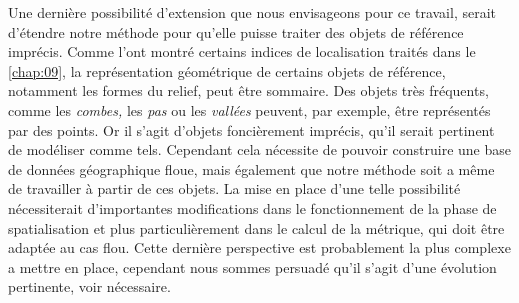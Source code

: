 Une dernière possibilité d'extension que nous envisageons pour ce
travail, serait d'étendre notre méthode pour qu'elle puisse traiter
des objets de référence imprécis. Comme l'ont montré certains indices
de localisation traités dans le \autoref{chap:09}, la représentation
géométrique de certains objets de référence, notamment les formes du
relief, peut être sommaire. Des objets très fréquents, comme les
\emph{combes,} les \emph{pas} ou les \emph{vallées} peuvent, par
exemple, être représentés par des points. Or il s'agit d'objets
foncièrement imprécis, qu'il serait pertinent de modéliser comme
tels. Cependant cela nécessite de pouvoir construire une base de
données géographique floue, mais également que notre méthode soit a
même de travailler à partir de ces objets. La mise en place d'une
telle possibilité nécessiterait d'importantes modifications dans le
fonctionnement de la phase de spatialisation et plus particulièrement
dans le calcul de la métrique, qui doit être adaptée au cas
flou. Cette dernière perspective est probablement la plus complexe a
mettre en place, cependant nous sommes persuadé qu'il s'agit d'une
évolution pertinente, voir nécessaire.


